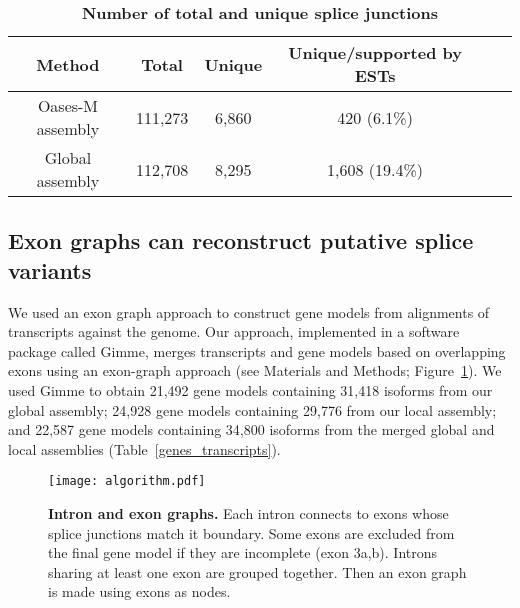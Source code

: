 \begin{table}
\caption{
\textbf{Number of total and unique splice junctions}}
\begin{center}
\begin{tabular}{cccccc}
\hline
Method& Total & Unique & Unique/supported by ESTs \\ 
\hline
Oases-M assembly & 111,273 & 6,860 & 420 (6.1\%) \\
Global assembly & 112,708 & 8,295 & 1,608 (19.4\%) \\
\hline
\end{tabular}
\label{Oases-M}
\end{center}
\end{table}




\subsection{Exon graphs can reconstruct putative splice variants}

We used an exon graph approach to construct gene models from
alignments of transcripts against the genome.  Our approach,
implemented in a software package called Gimme, merges transcripts and
gene models based on overlapping exons using an exon-graph approach
(see Materials and Methods; Figure~\ref{algorithm}).  We used Gimme to obtain
21,492 gene models containing 31,418 isoforms from our global
assembly; 24,928 gene models containing 29,776 from our local
assembly; and 22,587 gene models containing 34,800 isoforms from the
merged global and local assemblies (Table~\ref{genes_transcripts}).

\begin{figure}[!ht]
\begin{center}
\texttt{[image: algorithm.pdf]}
\end{center}
\caption{
\textbf{Intron and exon graphs.} Each intron connects to exons whose splice
junctions match it boundary.  Some exons are excluded from the final gene model
if they are incomplete (exon 3a,b).  Introns sharing at least one exon are
grouped together.  Then an exon graph is made using exons as nodes.
}
\label{algorithm}
\end{figure}

